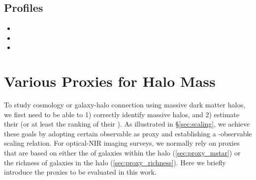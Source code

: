 \documentclass[a4paper,fleqn,usenatbib]{mnras}
\begin{document}

\subsection{\dsigma{} Profiles}
    \label{sec:dsigma}


    \begin{itemize}

        \item {}

		\item {}

		\item {}

	\end{itemize}



\section{Various Proxies for Halo Mass}
    \label{sec:proxies}

    To study cosmology or galaxy-halo connection using massive dark matter halos, we first 
    need to be able to 1) correctly identify massive halos, and 2) estimate their \mvir{}
    (or at least the ranking of their \mvir{}).
    As illustrated in \S \ref{sec:scaling}, we achieve these goals by adopting certain observable 
    as \mvir{} proxy and establishing a \mvir{}-observable scaling relation.
    For optical-NIR imaging surveys, we normally rely on \mvir{} proxies that are based on
    either the \mstar{} of galaxies within the halo (\ref{sec:proxy_mstar}) or the richness of 
    galaxies in the halo (\ref{sec:proxy_richness}).
    Here we briefly introduce the \mvir{} proxies to be evaluated in this work. 
\end{document}
